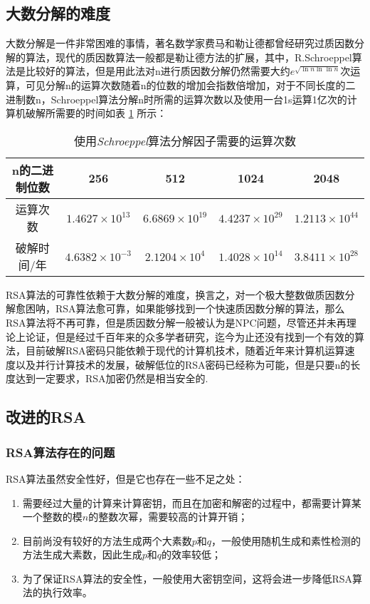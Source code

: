 \documentclass[UTF8]{ctexart}
\begin{document}
\subsection{大数分解的难度}

大数分解是一件非常困难的事情，著名数学家费马和勒让德都曾经研究过质因数分解的算法，现代的质因数算法一般都是勒让德方法的扩展，其中，R.Schroeppel算法是比较好的算法，但是用此法对n进行质因数分解仍然需要大约$e^{\sqrt{\ln{n}\ln{\ln{n}}}}$次运算，可见分解n的运算次数随着n的位数的增加会指数倍增加，对于不同长度的二进制数n，Schroeppel算法分解n时所需的运算次数以及使用一台1s运算1亿次的计算机破解所需要的时间如表 \ref{tab:operation} 所示：

\begin{table}[htbp]
\centering
\caption{使用\emph{Schroeppel}算法分解因子需要的运算次数} \label{tab:operation}
\begin{tabular}{ccccc}
\toprule
n的二进制位数   &   256 &   512 &   1024    &   2048\\
\midrule
运算次数       &    $1.4627 \times 10^{13}$ & $6.6869 \times 10^{19}$ &$4.4237 \times 10^{29}$ & $1.2113 \times 10^{44}$\\
\midrule
破解时间/年	   &	$4.6382 \times 10^{-3}$ & $2.1204 \times 10^{4}$ & $1.4028 \times 10^{14}$ & $3.8411 \times 10^{28}$\\
\bottomrule
\end{tabular}
\end{table}

RSA算法的可靠性依赖于大数分解的难度，换言之，对一个极大整数做质因数分解愈困呐，RSA算法愈可靠，如果能够找到一个快速质因数分解的算法，那么RSA算法将不再可靠，但是质因数分解一般被认为是NPC问题，尽管还并未再理论上论证，但是经过千百年来的众多学者研究，迄今为止还没有找到一个有效的算法，目前破解RSA密码只能依赖于现代的计算机技术，随着近年来计算机运算速度以及并行计算技术的发展，破解低位的RSA密码已经称为可能，但是只要n的长度达到一定要求，RSA加密仍然是相当安全的.

\subsection{改进的RSA}

\subsubsection{RSA算法存在的问题}
RSA算法虽然安全性好，但是它也存在一些不足之处：
\begin{enumerate}
	\item 需要经过大量的计算来计算密钥，而且在加密和解密的过程中，都需要计算某一个整数的模$n$的整数次幂，需要较高的计算开销；
	\item 目前尚没有较好的方法生成两个大素数$p$和$q$，一般使用随机生成和素性检测的方法生成大素数，因此生成$p$和$q$的效率较低；
	\item 为了保证RSA算法的安全性，一般使用大密钥空间，这将会进一步降低RSA算法的执行效率。
\end{enumerate}
\end{document}
